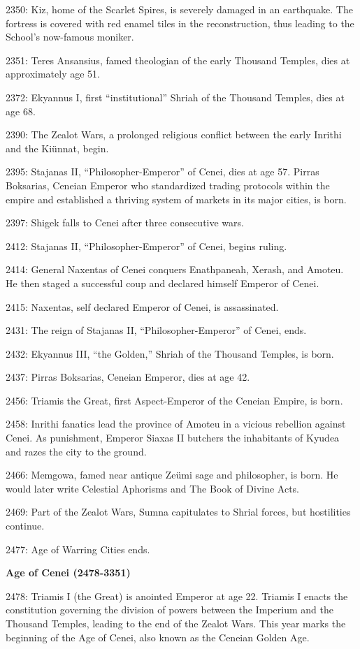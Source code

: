 \documentclass[]{book}
\begin{document}
2350: Kiz, home of the Scarlet Spires, is severely damaged in an earthquake. The
fortress is covered with red enamel tiles in the reconstruction, thus leading to
the School's now-famous moniker.

2351: Teres Ansansius, famed theologian of the early Thousand Temples, dies at
approximately age 51.

2372: Ekyannus I, first ``institutional'' Shriah of the Thousand Temples, dies at age
68.

2390: The Zealot Wars, a prolonged religious conflict between the early Inrithi and
the Kiünnat, begin.

2395: Stajanas II, ``Philosopher-Emperor'' of Cenei, dies at age 57. Pirras Boksarias,
Ceneian Emperor who standardized trading protocols within the empire and
established a thriving system of markets in its major cities, is born.

2397: Shigek falls to Cenei after three consecutive wars.

2412: Stajanas II, ``Philosopher-Emperor'' of Cenei, begins ruling.

2414: General Naxentas of Cenei conquers Enathpaneah, Xerash, and Amoteu. He
then staged a successful coup and declared himself Emperor of Cenei.

2415: Naxentas, self declared Emperor of Cenei, is assassinated.

2431: The reign of Stajanas II, ``Philosopher-Emperor'' of Cenei, ends.

2432: Ekyannus III, ``the Golden,'' Shriah of the Thousand Temples, is born.

2437: Pirras Boksarias, Ceneian Emperor, dies at age 42.

2456: Triamis the Great, first Aspect-Emperor of the Ceneian Empire, is born.

2458: Inrithi fanatics lead the province of Amoteu in a vicious rebellion against
Cenei. As punishment, Emperor Siaxas II butchers the inhabitants of Kyudea and razes the city to the ground.

2466: Memgowa, famed near antique Zeümi sage and philosopher, is born. He would
later write Celestial Aphorisms and The Book of Divine Acts.

2469: Part of the Zealot Wars, Sumna capitulates to Shrial forces, but hostilities
continue.

2477: Age of Warring Cities ends.

\textbf{Age of Cenei (2478-3351)}

2478: Triamis I (the Great) is anointed Emperor at age 22. Triamis I enacts the
constitution governing the division of powers between the Imperium and the
Thousand Temples, leading to the end of the Zealot Wars. This year marks the
beginning of the Age of Cenei, also known as the Ceneian Golden Age.
\end{document}
